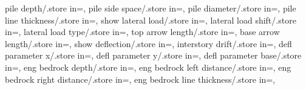 {  pile depth/.store in=\piledepth,
  pile side space/.store in=\pilesidespace,
  pile diameter/.store in=\pilediameter,
  pile line thickness/.store in=\pilelinethickness,
  show lateral load/.store in=\showlatload,
  lateral load shift/.store in=\latloadshift,
  lateral load type/.store in=\latloadtype,
  top arrow length/.store in=\toparrlen,
  base arrow length/.store in=\basearrlen,
  show deflection/.store in=\showdefl, 
  interstory drift/.store in=\drift,
  defl parameter x/.store in=,
  defl parameter y/.store in=,
  defl parameter base/.store in=,
  eng bedrock depth/.store in=\engbedrockdepth,
  eng bedrock left distance/.store in=\engbedrockleftdist,
  eng bedrock right distance/.store in=\engbedrockrightdist,
  eng bedrock line thickness/.store in=\engbedrocklinewidth,
}
\newcommand{\framestructure}[1][]{
\pgfkeys{/framestructure, default, #1}
\tikzmath{
int \storynumber, \baynumber, \columnnumber, \levelnumber, \storyminone;
int \nlevmo, \ncolmo, \iii, \j, \pileind;
real \storyheight, \baywidth, \startx, \starty, \xx, \y;
int \numberofisolators, \kiso, \isoshiftyn;
real \supportwidth, \supportheight, \isolationwidth, \isolationdepth, \isomidy;
real \foundationdepth, \massrad, \xiso, \isospace;
real \axisseperation, \linet, \baselinet, \isolinet;
real \beamlinet/2, \collinet/2;
real \rigbasestartx, \rigbaseendx, \isoboty, \isotopy, \isoshift;
real \foundboty, \foundtopy, \foundstartx, \foundendx;
int \doflocfloor, \dofloch, \dofloccolumn;
int \showaxes, \showdof, \showmass, \showsupports;
real \arrowlenratio, \minlen, \dofxx, \dofyy, \arrlen, \arrrad;
real \dofxrotation, \dofyrotation, \dofrrotation;
real \rotdofstartangle, \rotdofendangle;
int \subfloors, \deflstart, \deflstartplusone, \superstorynumber;
real \basewallstartx, \basewallstarty, \basewallendx, \basewallendy;
real \buildingwidth, \basewalldepth;
int \halfspacetype;
real \leftsoildist, \rightsoildist, \leftsoildepth, \rightsoildepth;
real \soilbelowfound, \leftcontrolx, \leftcontroly;
real \rightcontrolx, \rightcontroly;
real \rightsoilx, \rightsoily;
real \axeslenX, \axeslenY;
real \piledepth, \pilesidespace, \pilespace, \pilecoordy, \pilecoordx;
real \pilelinethickness;
real \latloadshift, \arrstartx, \toparrlen, \addtempy, \basearrlen;
int \latloadtype, \iarr, \showlatload;
int \substextnum;
int \showdefl;
int \istory, \ibay, \icol, \ibeam, \idefl, \jdefl;
real \drift, \deflect, \defparx, \defpary, \defparbeamx, \defparbeamy, \defbase;
real \tempdim, \fixbeamx, \fixbeamy;
int \dofcounterx, \dofcountery, \dofcounterz;
real \engbedrockdepth, \engbedrockleftdist, \engbedrockrightdist;
}}
